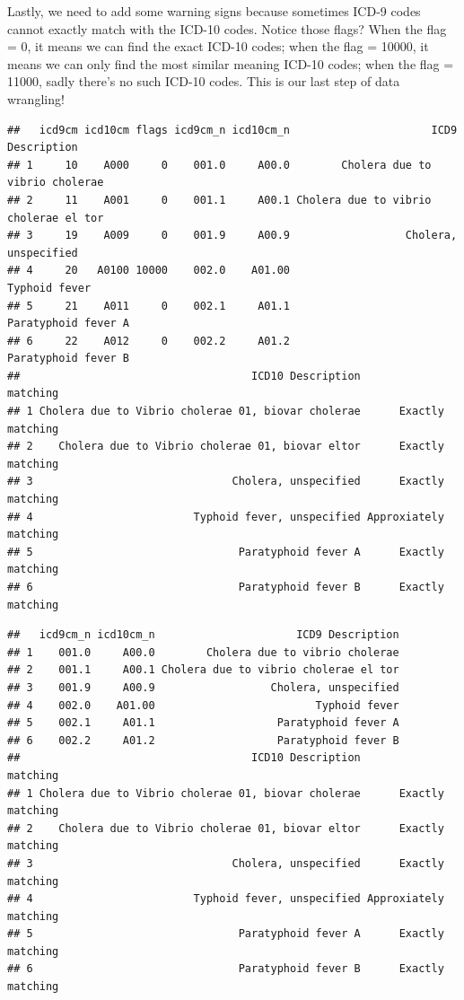 \documentclass[
]{article}
\begin{document}
Lastly, we need to add some warning signs because sometimes ICD-9 codes
cannot exactly match with the ICD-10 codes. Notice those flags? When the
flag = 0, it means we can find the exact ICD-10 codes; when the flag =
10000, it means we can only find the most similar meaning ICD-10 codes;
when the flag = 11000, sadly there's no such ICD-10 codes. This is our
last step of data wrangling!

\begin{verbatim}
##   icd9cm icd10cm flags icd9cm_n icd10cm_n                      ICD9 Description
## 1     10    A000     0    001.0     A00.0        Cholera due to vibrio cholerae
## 2     11    A001     0    001.1     A00.1 Cholera due to vibrio cholerae el tor
## 3     19    A009     0    001.9     A00.9                  Cholera, unspecified
## 4     20   A0100 10000    002.0    A01.00                         Typhoid fever
## 5     21    A011     0    002.1     A01.1                   Paratyphoid fever A
## 6     22    A012     0    002.2     A01.2                   Paratyphoid fever B
##                                    ICD10 Description              matching
## 1 Cholera due to Vibrio cholerae 01, biovar cholerae      Exactly matching
## 2    Cholera due to Vibrio cholerae 01, biovar eltor      Exactly matching
## 3                               Cholera, unspecified      Exactly matching
## 4                         Typhoid fever, unspecified Approxiately matching
## 5                                Paratyphoid fever A      Exactly matching
## 6                                Paratyphoid fever B      Exactly matching
\end{verbatim}

\begin{verbatim}
##   icd9cm_n icd10cm_n                      ICD9 Description
## 1    001.0     A00.0        Cholera due to vibrio cholerae
## 2    001.1     A00.1 Cholera due to vibrio cholerae el tor
## 3    001.9     A00.9                  Cholera, unspecified
## 4    002.0    A01.00                         Typhoid fever
## 5    002.1     A01.1                   Paratyphoid fever A
## 6    002.2     A01.2                   Paratyphoid fever B
##                                    ICD10 Description              matching
## 1 Cholera due to Vibrio cholerae 01, biovar cholerae      Exactly matching
## 2    Cholera due to Vibrio cholerae 01, biovar eltor      Exactly matching
## 3                               Cholera, unspecified      Exactly matching
## 4                         Typhoid fever, unspecified Approxiately matching
## 5                                Paratyphoid fever A      Exactly matching
## 6                                Paratyphoid fever B      Exactly matching
\end{verbatim}
\end{document}
